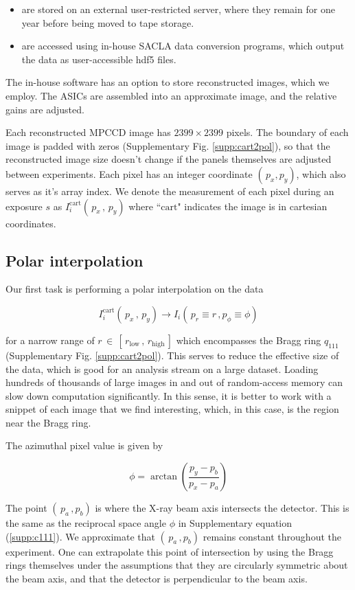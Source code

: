 \documentclass [12pt,fleqn]{article}
\def \be {\begin{equation}}
\def \ee {\end{equation}}
\begin{document}
\begin{itemize}
\item are stored on an external user-restricted server, where they remain for one year before being moved to tape storage. 
\item are accessed using in-house SACLA data conversion programs, which output the data as user-accessible hdf5 files.  
\end{itemize}

The in-house software has an option to store reconstructed images, which we employ. The ASICs are assembled into an approximate image, and the relative gains are adjusted. 

Each reconstructed MPCCD image has $2399\times 2399$ pixels. The boundary of each image is padded with zeros (Supplementary Fig. \ref{supp:cart2pol}), so that the reconstructed image size doesn't change if the panels themselves are adjusted between experiments. Each pixel has an integer coordinate $(\,p_x, p_y)$, which also serves as it's array index. We denote the measurement of each pixel during an exposure $s$ as $I_i^{ \mathrm{cart} }(\,p_x\,, \,p_y)$ where ``$\text{cart}$" indicates the image is in cartesian coordinates.


\subsection{Polar interpolation}
Our first task is performing a polar interpolation on the data

\be
I_i^{ \mathrm{cart} }(\,p_x\,, \, p_y) \rightarrow I_i(\,p_r\equiv r \,, p_\phi \equiv \phi)
\ee

for a narrow range of $r \,\in\, [\,r_{\text{low}}\,,\, r_{\text{high}}\,]$ which encompasses the Bragg ring $q_{111}$ (Supplementary Fig. \ref{supp:cart2pol}). This serves to reduce the effective size of the data, which is good for an analysis stream on a large dataset. Loading hundreds of thousands of large images in and out of random-access memory can slow down computation significantly. In this sense, it is better to work with a snippet of each image that we find interesting, which, in this case, is the region near the Bragg ring.

The azimuthal pixel value is given by

\be
\phi = \arctan\left( \frac{p_y - p_b}{p_x - p_a} \right )
\ee

The point $(\,p_a\,,p_b)$ is where the X-ray beam axis intersects the detector. This is the same  as the reciprocal space angle $\phi$ in Supplementary equation (\ref{supp:c111}). We approximate that $(\,p_a\,,p_b)$ remains constant throughout the experiment. One can extrapolate this point of intersection by using the Bragg rings themselves under the assumptions that they are circularly symmetric about the beam axis, and that the detector is perpendicular to the beam axis.
\end{document}

